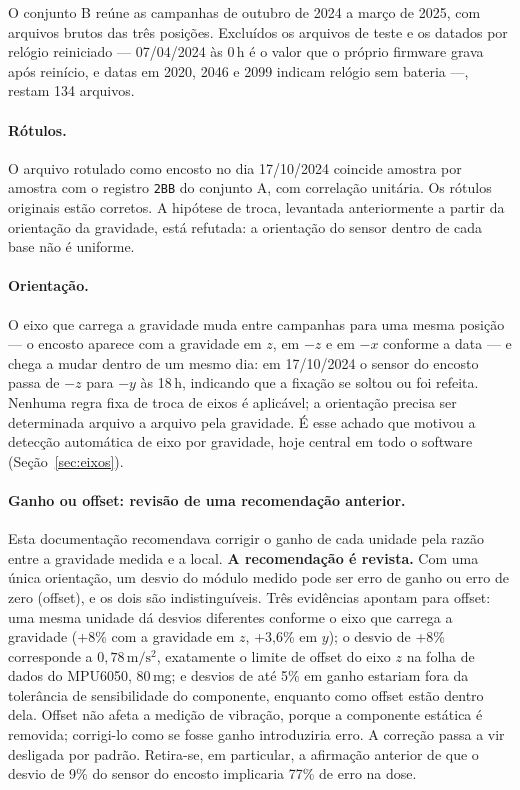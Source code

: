 \documentclass[11pt,a4paper]{article}
\newcommand{\code}[1]{\texttt{\small #1}}
\newcommand{\unit}[2]{\ensuremath{#1\,\mathrm{#2}}}
\begin{document}
O conjunto B reúne as campanhas de outubro de 2024 a março de 2025, com arquivos
brutos das três posições. Excluídos os arquivos de teste e os datados por relógio
reiniciado --- 07/04/2024 às 0\,h é o valor que o próprio firmware grava após
reinício, e datas em 2020, 2046 e 2099 indicam relógio sem bateria ---, restam
134 arquivos.

\paragraph{Rótulos.} O arquivo rotulado como encosto no dia 17/10/2024 coincide
amostra por amostra com o registro \code{2BB} do conjunto A, com correlação
unitária. Os rótulos originais estão corretos. A hipótese de troca, levantada
anteriormente a partir da orientação da gravidade, está refutada: a orientação
do sensor dentro de cada base não é uniforme.

\paragraph{Orientação.} O eixo que carrega a gravidade muda entre campanhas para
uma mesma posição --- o encosto aparece com a gravidade em $z$, em $-z$ e em
$-x$ conforme a data --- e chega a mudar dentro de um mesmo dia: em 17/10/2024 o
sensor do encosto passa de $-z$ para $-y$ às 18\,h, indicando que a fixação se
soltou ou foi refeita. Nenhuma regra fixa de troca de eixos é aplicável; a
orientação precisa ser determinada arquivo a arquivo pela gravidade. É esse
achado que motivou a detecção automática de eixo por gravidade, hoje central em
todo o software (Seção~\ref{sec:eixos}).

\paragraph{Ganho ou offset: revisão de uma recomendação anterior.} Esta
documentação recomendava corrigir o ganho de cada unidade pela razão entre a
gravidade medida e a local. \textbf{A recomendação é revista.} Com uma única
orientação, um desvio do módulo medido pode ser erro de ganho ou erro de zero
(offset), e os dois são indistinguíveis. Três evidências apontam para offset:
uma mesma unidade dá desvios diferentes conforme o eixo que carrega a gravidade
(+8\% com a gravidade em $z$, +3,6\% em $y$); o desvio de +8\% corresponde a
\unit{0{,}78}{m/s^2}, exatamente o limite de offset do eixo $z$ na folha de
dados do MPU6050, 80\,mg; e desvios de até 5\% em ganho estariam fora da
tolerância de sensibilidade do componente, enquanto como offset estão dentro
dela. Offset não afeta a medição de vibração, porque a componente estática é
removida; corrigi-lo como se fosse ganho introduziria erro. A correção passa a
vir desligada por padrão. Retira-se, em particular, a afirmação anterior de que
o desvio de 9\% do sensor do encosto implicaria 77\% de erro na dose.
\end{document}
